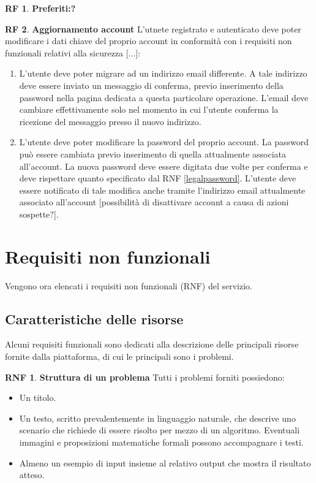 \documentclass[11pt, a4paper]{article}
\theoremstyle{definition}
\newtheorem{funcreq}{RF} %
\newtheorem{nonfuncreq}{RNF} %
\begin{document}
\begin{funcreq}
\textbf{Preferiti:?}

\end{funcreq}


\begin{funcreq}
\label{updateaccount}
\textbf{Aggiornamento account }
L'utnete registrato e autenticato deve poter modificare i dati chiave del
proprio account in conformità con i requisiti non funzionali relativi alla
sicurezza [...]:
\begin{enumerate}
\item L'utente deve poter migrare ad un indirizzo email differente. A tale
indirizzo deve essere inviato un messaggio di conferma, previo inserimento
della password nella pagina dedicata a questa particolare operazione. L'email
deve cambiare effettivamente solo nel momento in cui l'utente conferma la
ricezione del messaggio presso il nuovo indirizzo.

\item L'utente deve poter modificare la password del proprio account.
La password può essere cambiata previo inserimento di quella attualmente
associata all'account. La nuova password deve essere digitata due volte
per conferma e deve rispettare quanto specificato dal RNF \ref{legalpassword}. 
L'utente deve essere notificato di tale modifica anche tramite
l'indirizzo email attualmente associato all'account [possibilità di
disattivare account a causa di azioni sospette?].
\end{enumerate}
\end{funcreq}


\newpage
\section{Requisiti non funzionali}
Vengono ora elencati i requisiti non funzionali (RNF) del servizio.

\subsection{Caratteristiche delle risorse}
Alcuni requisiti funzionali sono dedicati alla descrizione delle principali
risorse fornite dalla piattaforma, di cui le principali sono i problemi.

\begin{nonfuncreq}
\label{formatoproblema}
\textbf{Struttura di un problema }
Tutti i problemi forniti possiedono:
\begin{itemize}
    \item Un titolo.

    \item Un testo, scritto prevalentemente in linguaggio naturale,
    che descrive uno scenario che richiede di essere risolto per mezzo
    di un algoritmo. Eventuali immagini e proposizioni matematiche
    formali possono accompagnare i testi.

    \item Almeno un esempio di input insieme al relativo output che
    mostra il risultato atteso.
\end{itemize}
\end{nonfuncreq}
\end{document}
